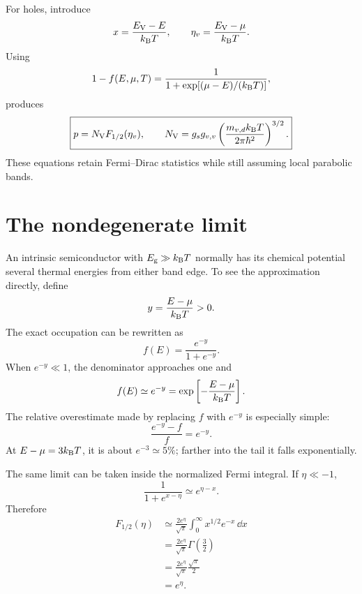 For holes, introduce
\begin{equation}
  x=\frac{E_{\mathrm V}-E}{k_{\mathrm B} T},
  \qquad
  \eta_v=\frac{E_{\mathrm V}-\mu}{k_{\mathrm B} T}.
  \label{eq:hole-fermi-integral-variables}
\end{equation}
Using
\begin{equation}
  1-f(E,\mu,T)
  =\frac{1}{1+\exp[(\mu-E)/(k_{\mathrm B} T)]},
  \label{eq:hole-occupation-probability}
\end{equation}
produces
\begin{equation}
  \boxed{
  p=N_{\mathrm V} F_{1/2}(\eta_v),
  \qquad
  N_{\mathrm V}=g_sg_{v,v}
  \left(\frac{m_{v,d}k_{\mathrm B} T}{2\pi\hbar^2}\right)^{3/2}.
  }
  \label{eq:exact-hole-concentration-fermi-integral}
\end{equation}
These equations retain Fermi--Dirac statistics while still assuming local
parabolic bands.

\section{The nondegenerate limit}

An intrinsic semiconductor with $E_{\mathrm g}\gg k_{\mathrm B} T$ normally has its chemical
potential several thermal energies from either band edge.  To see the
approximation directly, define
\begin{equation}
  y=\frac{E-\mu}{k_{\mathrm B} T}>0.
  \label{eq:reduced-energy-boltzmann-tail}
\end{equation}
The exact occupation can be rewritten as
\begin{equation}
  f(E)=\frac{e^{-y}}{1+e^{-y}}.
  \label{eq:fermi-tail-rewritten}
\end{equation}
When $e^{-y}\ll1$, the denominator approaches one and
\begin{equation}
  f(E)\simeq e^{-y}
  =\exp\left[-\frac{E-\mu}{k_{\mathrm B} T}\right].
  \label{eq:single-state-boltzmann-approximation}
\end{equation}
The relative overestimate made by replacing $f$ with $e^{-y}$ is especially
simple:
\begin{equation}
  \frac{e^{-y}-f}{f}=e^{-y}.
  \label{eq:boltzmann-relative-error}
\end{equation}
At $E-\mu=3k_{\mathrm B} T$, it is about $e^{-3}\simeq5\%$; farther into the tail it
falls exponentially.

The same limit can be taken inside the normalized Fermi integral.  If
$\eta\ll-1$,
\begin{equation}
  \frac{1}{1+e^{x-\eta}}
  \simeq e^{\eta-x}.
  \label{eq:fermi-integral-integrand-boltzmann-limit}
\end{equation}
Therefore
\begin{equation}
\begin{aligned}
  F_{1/2}(\eta)
  &\simeq\frac{2e^\eta}{\sqrt\pi}
    \int_0^\infty x^{1/2}e^{-x}\,\dd x\\
  &=\frac{2e^\eta}{\sqrt\pi}
    \Gamma\left(\frac32\right)\\
  &=\frac{2e^\eta}{\sqrt\pi}
    \frac{\sqrt\pi}{2}\\
  &=e^\eta.
\end{aligned}
  \label{eq:fermi-integral-boltzmann-limit}
\end{equation}

